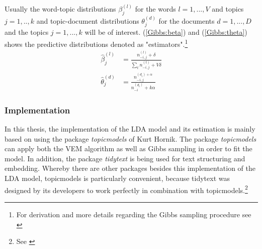 \documentclass[11pt,a4paper]{article}
\begin{document}
Usually the word-topic distributions $\beta_{j}^{(l)}$ for the words $l=1,...,V$ and topics $j=1,..,k$ and topic-document distributions $\theta_j^{(d)}$ for the documents $d=1,...,D$ and the topics $j=1,...,k$ will be of interest. (\ref{Gibbs:beta}) and (\ref{Gibbs:theta}) shows the predictive distributions denoted as "estimators".\footnote{For derivation and more details regarding the Gibbs sampling procedure see \cite{Griffiths2006}}
\begin{align}
	\hat\beta_{j}^{(l)}&=\frac{n_{-i,j}^{(l)}+\delta}{\sum_t n_{-i,j}^{(t)}+V\delta} \label{Gibbs:beta} \\
	\hat\theta_j^{(d)}&= \frac{n_{-i,j}^{(d_i)+\alpha}}{n_{-i}^{(d_i)}+k\alpha} \label{Gibbs:theta}
\end{align}

\subsubsection{Implementation}

In this thesis, the implementation of the LDA model and its estimation is mainly based on using the package \textit{topicmodels} of Kurt Hornik. The package \textit{topicmodels} can apply both the VEM algorithm as well as Gibbs sampling in order to fit the model. In addition, the package \textit{tidytext} is being used for text structuring and embedding. Whereby there are other packages besides this implementation of the LDA model, topicmodels is particularly convenient, because tidytext was designed by its developers to work perfectly in combination with topicmodels.\footnote{See \cite[p. 89]{Silge2017}}









	
  
  

	
	
\end{document}
